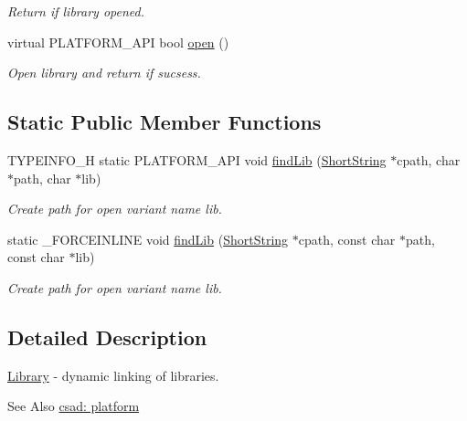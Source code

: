 \begin{DoxyCompactItemize}
\begin{DoxyCompactList}\small\item\em Return if library opened. \end{DoxyCompactList}\item 
\hypertarget{classcsad_1_1_library_a92acc6769de26d837472de603cba13db}{virtual P\-L\-A\-T\-F\-O\-R\-M\-\_\-\-A\-P\-I bool \hyperlink{classcsad_1_1_library_a92acc6769de26d837472de603cba13db}{open} ()}\label{classcsad_1_1_library_a92acc6769de26d837472de603cba13db}

\begin{DoxyCompactList}\small\item\em Open library and return if sucsess. \end{DoxyCompactList}\end{DoxyCompactItemize}
\subsection*{Static Public Member Functions}
\begin{DoxyCompactItemize}
\item 
\hypertarget{classcsad_1_1_library_a3df54c5e3e5a634c8f9e27d1648b55be}{T\-Y\-P\-E\-I\-N\-F\-O\-\_\-\-H static P\-L\-A\-T\-F\-O\-R\-M\-\_\-\-A\-P\-I void \hyperlink{classcsad_1_1_library_a3df54c5e3e5a634c8f9e27d1648b55be}{find\-Lib} (\hyperlink{classbt_1_1_short_string}{Short\-String} $\ast$cpath, char $\ast$path, char $\ast$lib)}\label{classcsad_1_1_library_a3df54c5e3e5a634c8f9e27d1648b55be}

\begin{DoxyCompactList}\small\item\em Create path for open variant name lib. \end{DoxyCompactList}\item 
\hypertarget{classcsad_1_1_library_ad16acf9b0b3caf69a507b0e0481c9310}{static \-\_\-\-F\-O\-R\-C\-E\-I\-N\-L\-I\-N\-E void \hyperlink{classcsad_1_1_library_ad16acf9b0b3caf69a507b0e0481c9310}{find\-Lib} (\hyperlink{classbt_1_1_short_string}{Short\-String} $\ast$cpath, const char $\ast$path, const char $\ast$lib)}\label{classcsad_1_1_library_ad16acf9b0b3caf69a507b0e0481c9310}

\begin{DoxyCompactList}\small\item\em Create path for open variant name lib. \end{DoxyCompactList}\end{DoxyCompactItemize}


\subsection{Detailed Description}
\hyperlink{classcsad_1_1_library}{Library} -\/ dynamic linking of libraries. 

\begin{DoxySeeAlso}{See Also}
\hyperlink{group__platform}{csad\-: platform} 
\end{DoxySeeAlso}
